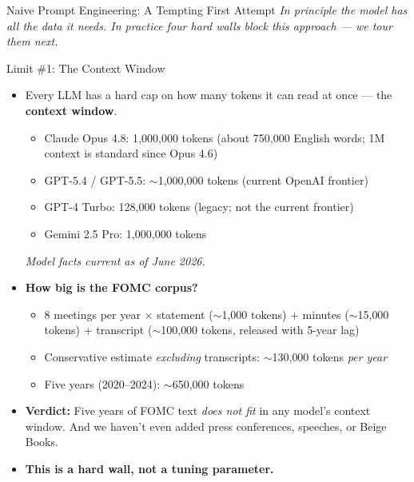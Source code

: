 \begin{frame}{Naive Prompt Engineering: A Tempting First Attempt}
\vspace{-0.05cm}
\textit{In principle the model has all the data it needs. In practice four hard walls block this approach --- we tour them next.}
\end{frame}

\begin{frame}{Limit \#1: The Context Window}
\begin{itemize}
\item Every LLM has a hard cap on how many tokens it can read at once --- the \textbf{context window}.
\begin{itemize}
    \item Claude Opus 4.8: 1{,}000{,}000 tokens (about 750{,}000 English words; 1M context is standard since Opus 4.6)
    \item GPT-5.4 / GPT-5.5: ${\sim}$1{,}000{,}000 tokens (current OpenAI frontier)
    \item GPT-4 Turbo: 128{,}000 tokens (legacy; not the current frontier)
    \item Gemini 2.5 Pro: 1{,}000{,}000 tokens
\end{itemize}
\medskip
\footnotesize\textit{Model facts current as of June 2026.}\normalsize

\medskip
\item \textbf{How big is the FOMC corpus?}
\begin{itemize}
    \item 8 meetings per year $\times$ statement ($\sim$1{,}000 tokens) + minutes ($\sim$15{,}000 tokens) + transcript ($\sim$100{,}000 tokens, released with 5-year lag)
    \item Conservative estimate \emph{excluding} transcripts: $\sim$130{,}000 tokens \emph{per year}
    \item Five years (2020--2024): $\sim$650{,}000 tokens
\end{itemize}

\medskip
\item \textbf{Verdict:} Five years of FOMC text \emph{does not fit} in any model's context window. And we haven't even added press conferences, speeches, or Beige Books.

\medskip
\item \textbf{This is a hard wall, not a tuning parameter.}
\end{itemize}
\end{frame}

